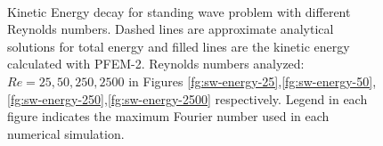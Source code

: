   \begin{figure}[h]
  \centering
     \\
   \caption{Kinetic Energy decay for standing wave problem with different Reynolds numbers. Dashed lines are approximate analytical solutions for total energy and filled lines are the kinetic energy calculated with PFEM-2. Reynolds numbers analyzed: $Re=25,50,250,2500$ in Figures \ref{fg:sw-energy-25},\ref{fg:sw-energy-50},\ref{fg:sw-energy-250},\ref{fg:sw-energy-2500} respectively. Legend in each figure indicates the maximum Fourier number used in each numerical simulation.}
   \label{fg:sw-energy}
\end{figure}
